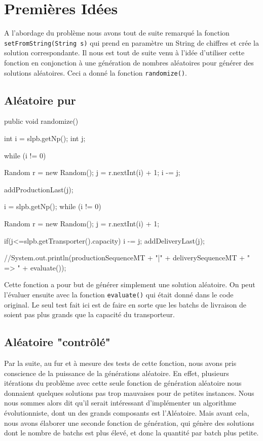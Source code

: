 \section{Premières Idées}
A l'abordage du problème nous avons tout de suite remarqué la fonction \verb!setFromString(String s)! qui prend en paramètre un String de chiffres et crée la solution correspondante. Il nous est tout de suite venu à l'idée d'utiliser cette fonction en conjonction à une génération de nombres aléatoires pour générer des solutions aléatoires. Ceci a donné la fonction \verb!randomize()!.

\subsection{Aléatoire pur}
\begin{java}
public void randomize() {
	int i = slpb.getNp();
	int j;

	while (i != 0) {
		Random r = new Random();
		j = r.nextInt(i) + 1;
		i -= j;
	
		addProductionLast(j);
	}

	i = slpb.getNp();
	while (i != 0) {
		Random r = new Random();
		j = r.nextInt(i) + 1;
	
		if(j<=slpb.getTransporter().capacity) {
			i -= j;
			addDeliveryLast(j);
		}
	}
	//System.out.println(productionSequenceMT + "|" + deliverySequenceMT + " => " + evaluate());
}
\end{java}
\vspace{1em}
Cette fonction a pour but de générer simplement une solution aléatoire. On peut l'évaluer ensuite avec la fonction \verb!evaluate()! qui était donné dans le code original. Le seul test fait ici est de faire en sorte que les batchs de livraison de soient pas plus grands que la capacité du transporteur.
\vspace{2em}

\subsection{Aléatoire "contrôlé"}
Par la suite, au fur et à mesure des tests de cette fonction, nous avons pris conscience de la puissance de la générations aléatoire. En effet, plusieurs itérations du problème avec cette seule fonction de génération aléatoire nous donnaient quelques solutions pas trop mauvaises pour de petites instances. Nous nous sommes alors dit qu'il serait intéressant d'implémenter un algorithme évolutionniste, dont un des grands composants est l'Aléatoire. Mais avant cela, nous avons élaborer une seconde fonction de génération, qui génère des solutions dont le nombre de batchs est plus élevé, et donc la quantité par batch plus petite.

